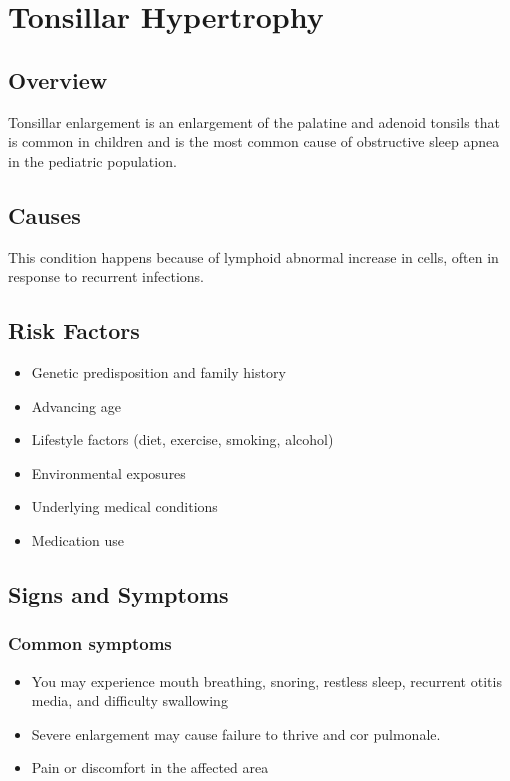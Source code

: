 \chapter{Tonsillar Hypertrophy}
\label{sec:Tonsillar Hypertrophy}

\section{Overview}
Tonsillar enlargement is an enlargement of the palatine and adenoid tonsils that is common in children and is the most common cause of obstructive sleep apnea in the pediatric population.
\section{Causes}
This condition happens because of lymphoid abnormal increase in cells, often in response to recurrent infections.     
\section{Risk Factors}

\begin{itemize}[noitemsep]
  \item Genetic predisposition and family history
  \item Advancing age
  \item Lifestyle factors (diet, exercise, smoking, alcohol)
  \item Environmental exposures
  \item Underlying medical conditions
  \item Medication use
\end{itemize}
\section{Signs and Symptoms}

\subsection{Common symptoms}
\begin{itemize}[noitemsep]
  \item You may experience mouth breathing, snoring, restless sleep, recurrent otitis media, and difficulty swallowing
  \item Severe enlargement may cause failure to thrive and cor pulmonale.
  \item Pain or discomfort in the affected area
  \end{itemize}

